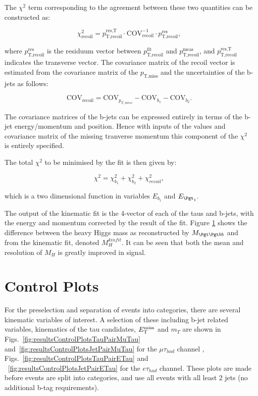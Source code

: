 The $\chi^{2}$ term corresponding to the agreement between these two quantities
can be constructed as:

\begin{equation}
\chi_{\text{recoil}}^{2} = p_{\text{T},\text{recoil}}^{\text{res},\text{T}} \cdot
\text{COV}_{\text{recoil}}^{-1} \cdot
p_{\text{T},\text{recoil}}^{\text{res}} ,  
\end{equation}

where $p_{\text{T},\text{recoil}}^{\text{res}}$ is the residuum vector between
$p_{\text{T},\text{recoil}}^{\text{fit}}$
and $p_{\text{T},\text{recoil}}^{\text{meas}}$, and
$p_{\text{T},\text{recoil}}^{\text{res},\text{T}}$ indicates the
transverse vector. The covariance matrix of the recoil vector is estimated from
the covariance matrix of the $p_{\text{T},\text{miss}}$ and the uncertainties of the b-jets as
follows:

\begin{equation}
\text{COV}_{\text{recoil}} = \text{COV}_{p_{T,miss}} - \text{COV}_{b_{1}} -
\text{COV}_{b_{2}} .
\end{equation}

The covariance matrices of the b-jets can be expressed entirely in terms of the
b-jet energy/momentum and position. Hence with inputs of the values and
covariance matrix of the missing tranverse momentum this component of the
$\chi^{2}$ is entirely specified. 

The total $\chi^{2}$ to be minimised by the fit is then given by:

\begin{equation}
\chi^{2}= \chi_{b_{1}}^{2} + \chi_{b_{2}}^{2} + \chi_{recoil}^{2},
\end{equation}

which is a two dimensional function in variables $E_{b_{1}}$ and $E_{\Pgt_{1}}$.

The output of the kinematic fit is the 4-vector of each of the taus and b-jets,
with the energy and momentum corrected by the result of the fit. Figure \ref{}
shows the difference between the heavy Higgs mass as reconstructed by
$M_{\Pgt\Pgt bb}$ and from the kinematic fit, denoted $M_{H}^{kinfit}$. It can
be seen that both the mean and resolution of $M_{H}$ is greatly improved in
signal.

\section{Control Plots}

For the preselection and separation of events into categories, there are several
kinematic variables of interest. A selection of these including b-jet related
variables, kinematics of the tau candidates, $E_{\mathrm{T}}^{\text{miss}}$ and $m_{T}$ are shown in
Figs.~\ref{fig:resultsControlPlotsTauPairMuTau}
and~\ref{fig:resultsControlPlotsJetPairMuTau} for the $\mu\tau_{had}$ channel
, Figs.~\ref{fig:resultsControlPlotsTauPairETau} and
~\ref{fig:resultsControlPlotsJetPairETau} for the $e\tau_{had}$ channel.
These plots are made before events are split into categories, and use all events
with all least 2 jets (no additional b-tag requirements).


